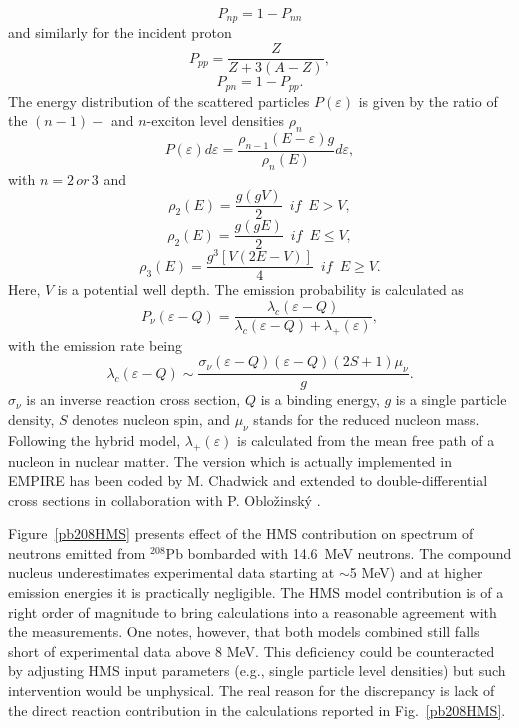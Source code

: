 \documentclass[twocolumn,amsmath,amssymb,10pt,groupedaddress,letter]{revtex4}
\begin{document}
\begin{equation}
P_{np}=1-P_{nn}\label{Pnp}\end{equation}
 and similarly for the incident proton
\begin{equation}
P_{pp}=\frac{Z}{Z+3(A-Z)},\label{Ppp}\end{equation}
\begin{equation}
P_{pn}=1-P_{pp}.\label{Ppn}\end{equation}
The energy distribution of the scattered particles $P(\varepsilon)$
is given by the ratio of the $(n-1)-$ and $n$-exciton level densities
$\rho_{n}$
\begin{equation}
P(\varepsilon)d\varepsilon=\frac{\rho_{n-1}(E-\varepsilon)g}{\rho_{n}(E)}d\varepsilon,\label{Penergy}\end{equation}
with $n=2\, or\,3$ and\begin{equation}
\rho_{2}(E)=\frac{g(gV)}{2}\,\,\, if\,\,\, E>V,\label{ro2u}\end{equation}
\begin{equation}
\rho_{2}(E)=\frac{g(gE)}{2}\,\,\, if\,\,\, E\leq V,\label{ro2d}\end{equation}
\begin{equation}
\rho_{3}(E)=\frac{g^{3}\left[V(2E-V)\right]}{4}\,\,\, if\,\,\, E\geq V.\label{ro3}\end{equation}
 Here, $V$ is a potential well depth. The emission probability is
calculated as
\begin{equation}
P_{\nu}(\varepsilon-Q)=\frac{\lambda_{c}(\varepsilon-Q)}{\lambda_{c}(\varepsilon-Q)+\lambda_{+}(\varepsilon)},\label{Pnu}\end{equation}
with the emission rate being
\begin{equation}
\lambda_{c}(\varepsilon-Q)\sim\frac{\sigma_{\nu}(\varepsilon-Q)(\varepsilon-Q)(2S+1)\mu_{\nu}}{g}.\label{lambdac}\end{equation}
$\sigma_{\nu}$ is an inverse reaction cross section, $Q$ is a binding
energy, $g$ is a single particle density, $S$ denotes nucleon spin,
and $\mu_{\nu}$ stands for the reduced nucleon mass. Following the
hybrid model, $\lambda_{+}(\varepsilon)$ is calculated
from the mean free path of a nucleon in nuclear matter.
The version which is actually implemented in EMPIRE has been coded
by M. Chadwick and extended to double-differential cross sections
in collaboration with P. Oblo\v zinsk\' y \cite{DDHMScode}.

Figure~\ref{pb208HMS} presents effect of the HMS contribution on
spectrum of neutrons emitted from $^{208}$Pb bombarded with  14.6~MeV neutrons.
The compound nucleus underestimates experimental data starting at $\sim$5 MeV) and at higher emission energies it is practically negligible. The HMS model contribution is of a right order of magnitude to bring calculations into a reasonable agreement with the measurements. One notes, however,  that both models combined still falls short of experimental data above 8 MeV. This deficiency could be counteracted by adjusting HMS input parameters (e.g., single particle level densities) but such intervention would be unphysical. The real reason for the discrepancy is lack of the direct reaction contribution in the calculations reported in Fig.~\ref{pb208HMS}.
\end{document}
